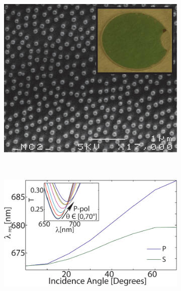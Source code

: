 \begin{figure}[t!]\centering
\begin{minipage}[c]{.48\linewidth}
		\begin{subfigure}{.01\linewidth}\caption{ }\label{sfig:NanoDisks} \vspace{4.cm}	\end{subfigure}  
		\begin{subfigure}{.98\linewidth}\hspace*{3em}\includegraphics[scale=1.]{0-4-Introduccion/figs/nanoDisk.png}\end{subfigure}\\
\noindent \begin{subfigure}{.01\linewidth}\caption{ }\label{sfig:TNanoD}\vspace{3.5cm}\end{subfigure}  
		\begin{subfigure}{.98\linewidth}\includegraphics[scale=1.1,trim={0 0 0 -1em},clip]{0-4-Introduccion/figs/TransmitanciaND.png}\end{subfigure}

\end{minipage}
\end{figure}
